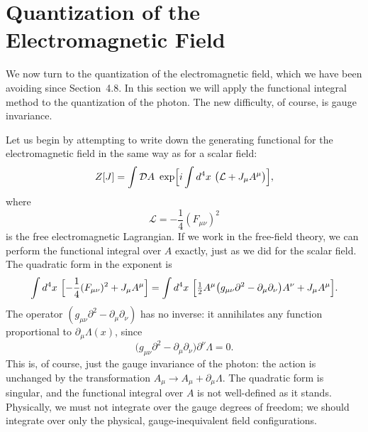 \section{Quantization of the Electromagnetic Field}

We now turn to the quantization of the electromagnetic field, which we have
been avoiding since Section~4.8.  In this section we will apply the functional
integral method to the quantization of the photon.  The new difficulty, of
course, is gauge invariance.

Let us begin by attempting to write down the generating functional for the
electromagnetic field in the same way as for a scalar field:
\begin{equation}
  Z[J] = \int \mathcal{D}A\ \exp\Bigl[ i\int d^4x\ \bigl(
    \mathcal{L} + J_\mu A^\mu \bigr) \Bigr] ,
  \label{eq:9.47}
\end{equation}
where
\begin{equation}
  \mathcal{L} = -\frac{1}{4}(F_{\mu\nu})^2
\end{equation}
is the free electromagnetic Lagrangian.  If we work in the free-field theory,
we can perform the functional integral over $A$ exactly, just as we did for the
scalar field.  The quadratic form in the exponent is
\begin{equation}
  \int d^4x\ \Bigl[ -\frac{1}{4}(F_{\mu\nu})^2 + J_\mu A^\mu \Bigr]
  = \int d^4x\ \Bigl[ \tfrac{1}{2}A^\mu\bigl( g_{\mu\nu}\partial^2
    - \partial_\mu\partial_\nu \bigr)A^\nu + J_\mu A^\mu \Bigr] .
  \label{eq:9.52}
\end{equation}
The operator $(g_{\mu\nu}\partial^2 - \partial_\mu\partial_\nu)$ has no
inverse: it annihilates any function proportional to $\partial_\mu\Lambda(x)$,
since
\begin{equation}
  \bigl( g_{\mu\nu}\partial^2 - \partial_\mu\partial_\nu \bigr)
    \partial^\nu\Lambda = 0 .
\end{equation}
This is, of course, just the gauge invariance of the photon: the action is
unchanged by the transformation $A_\mu\to A_\mu + \partial_\mu\Lambda$.  The
quadratic form is singular, and the functional integral over $A$ is not
well-defined as it stands.  Physically, we must not integrate over the gauge
degrees of freedom; we should integrate over only the physical, gauge-inequivalent
field configurations.

